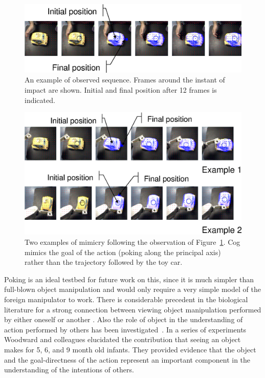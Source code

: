 %
%
\begin{figure}[tb]
\begin{center}
\includegraphics[width=\columnwidth]{observed-action.eps}
\caption{ 
\label{fig:observed-action}
%
%
An example of observed sequence. Frames around the instant of impact are shown.
Initial and final position after 12 frames is indicated.
}
\end{center}
\end{figure}
%
%

%
%
\begin{figure}[tb]
\begin{center}
\includegraphics[width=\columnwidth]{mimicked-action.eps}
\caption{ 
\label{fig:mimicked-action}
%
%
Two examples of mimicry following the observation of Figure~\ref{fig:observed-action}. 
Cog mimics the goal of the action (poking along the principal axis) rather than
the trajectory followed by the toy car.
}
\end{center}
\end{figure}
%
%






\ifverbose
Poking is an ideal testbed for future work on this, since it is much
simpler than full-blown object manipulation and would only require a
very simple model of the foreign manipulator to work.
There is considerable precedent in the biological literature for a
strong connection between viewing object manipulation performed by
either oneself or another \cite{wohlsclager02human}. Also
the role of object in the understanding of action performed by others
has been investigated~\cite{woodward98infants}. In a series of
experiments Woodward and colleagues elucidated the contribution that
seeing an object makes for 5, 6, and 9 month old infants. They
provided evidence that the object and the goal-directness of the
action represent an important component in the understanding of the
intentions of others.
\fi

